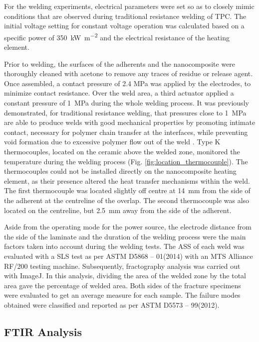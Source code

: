 \documentclass[11pt,review,times]{elsarticle}
\begin{document}
For the welding experiments, electrical parameters were set so as to closely mimic conditions that are observed during traditional resistance welding of TPC. 
The initial voltage setting for constant voltage operation was calculated based on a specific power of \SI{350}{\kW\per\square\metre} and the electrical resistance of the heating element. 

Prior to welding, the surfaces of the adherents and the nanocomposite were thoroughly cleaned with acetone to remove any traces of residue or release agent. 
Once assembled, a contact pressure of 2.4 MPa was applied by the electrodes, to minimize contact resistance. 
Over the weld area, a third actuator applied a constant pressure of \SI{1}{\MPa} during the whole welding process. 
It was previously demonstrated, for traditional resistance welding, that pressures close to \SI{1}{\MPa} are able to produce welds with good mechanical properties by promoting intimate contact, necessary for polymer chain transfer at the interfaces, while preventing void formation due to excessive polymer flow out of the weld \cite{Ageorges2000a, Dube2007, Shi2014}. 
Type K thermocouples, located on the ceramic above the welded zone, monitored the temperature during the welding process (Fig. \ref{fig:location_thermocouple}). 
The thermocouples could not be installed directly on the nanocomposite heating element, as their presence altered the heat transfer mechanisms within the weld. 
The first thermocouple was located slightly off centre at \SI{14}{\milli\metre} from the side of the adherent at the centreline of the overlap. 
The second thermocouple was also located on the centreline, but \SI{2.5}{\milli\metre} away from the side of the adherent.  

Aside from the operating mode for the power source, the electrode distance from the side of the laminate and the duration of the welding process were the main factors taken into account during the welding tests. 
The ASS of each weld was evaluated with a SLS test as per ASTM D5868 – 01(2014) with an MTS Alliance RF/200 testing machine. 
Subsequently, fractography analysis was carried out with ImageJ. 
In this analysis, dividing the area of the welded zone by the total area gave the percentage of welded area. 
Both sides of the fracture specimens were evaluated to get an average measure for each sample. 
The failure modes obtained were classified and reported as per ASTM D5573 – 99(2012). 

\FloatBarrier
\subsection{FTIR Analysis}
\end{document}
